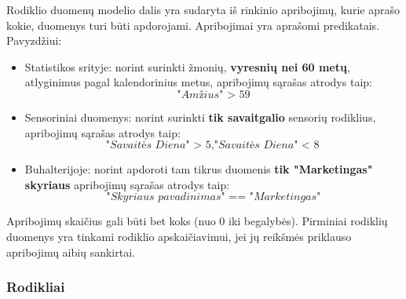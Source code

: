 \documentclass{VUMIFPSbakalaurinis}
\begin{document}
Rodiklio duomenų modelio dalis yra sudaryta iš rinkinio apribojimų, kurie aprašo kokie, duomenys turi būti apdorojami. Apribojimai yra aprašomi predikatais. Pavyzdžiui:
\begin{itemize}
    \item Statistikos srityje: norint surinkti žmonių, \textbf{vyresnių nei 60 metų}, atlyginimus pagal kalendorinius metus, apribojimų sąrašas atrodys taip: \[\textit{"Amžius" > 59}\]
    \item Sensoriniai duomenys: norint surinkti \textbf{tik savaitgalio} sensorių rodiklius, apribojimų sąrašas atrodys taip: \[\textit{"Savaitės Diena" > 5}, \textit{"Savaitės Diena" < 8}\]
    \item Buhalterijoje: norint apdoroti tam tikrus duomenis \textbf{tik "Marketingas" skyriaus} apribojimų sąrašas atrodys taip: \[\textit{"Skyriaus pavadinimas" == "Marketingas"}\] 
\end{itemize} \par  
Apribojimų skaičius gali būti bet koks (nuo 0 iki begalybės). Pirminiai rodiklių duomenys yra tinkami rodiklio apskaičiavimui, jei jų reikšmės priklauso apribojimų aibių sankirtai.  

\subsubsection{Rodikliai}
\end{document}
